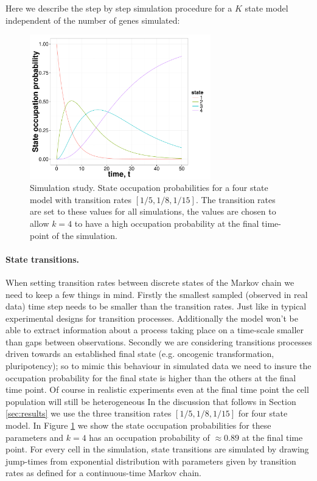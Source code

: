Here we describe the step by step simulation procedure for a $K$ state model independent of the number of genes simulated:

\begin{figure}
  \centering
  \includegraphics[width=0.7\textwidth]{pics/trans-rates.pdf}
  \caption{Simulation study. State occupation probabilities for a four state model with transition rates $[1/5, 1/8, 1/15]$. The transition rates are set to these values for all simulations, the values are chosen to allow $k=4$ to have a high occupation probability at the final time-point of the simulation.}
  \label{fig:transition-rates}
\end{figure}

\paragraph{State transitions.}
\label{sec:state-transitions}

When setting transition rates between discrete states of the Markov chain we need to keep a few things in mind. Firstly the smallest sampled (observed in real data) time step needs to be smaller than the transition rates. Just like in typical experimental designs for transition processes. Additionally the model won't be able to extract information about a process taking place on a time-scale smaller than gaps between observations. Secondly we are considering transitions processes driven towards an established final state (e.g. oncogenic transformation, pluripotency); so to mimic this behaviour in simulated data we need to insure the occupation probability for the final state is higher than the others at the final time point. Of course in realistic experiments even at the final time point the cell population will still be heterogeneous In the discussion that follows in Section \ref{sec:results} we use the three transition rates $[1/5, 1/8, 1/15]$ for four state model. In Figure \ref{fig:transition-rates} we show the state occupation probabilities for these parameters and $k=4$ has an occupation probability of $\approx 0.89$ at the final time point. For every cell in the simulation, state transitions are simulated by drawing jump-times from exponential distribution with parameters given by transition rates as defined for a continuous-time Markov chain.

